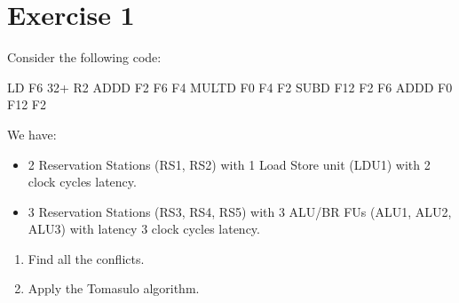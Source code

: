 \section{Exercise 1}

Consider the following code: 
\begin{verbnobox}[\verbarg]
LD F6 32+ R2
ADDD F2 F6 F4
MULTD F0 F4 F2
SUBD F12 F2 F6
ADDD F0 F12 F2
\end{verbnobox}
We have: 
\begin{itemize}
    \item 2 Reservation Stations (RS1, RS2) with 1 Load Store unit (LDU1) with 2 clock cycles latency.
    \item 3 Reservation Stations (RS3, RS4, RS5) with 3 ALU/BR FUs (ALU1, ALU2, ALU3) with latency 3 clock cycles latency.
\end{itemize}
\begin{enumerate}
    \item Find all the conflicts. 
    \item Apply the Tomasulo algorithm. 
\end{enumerate}

